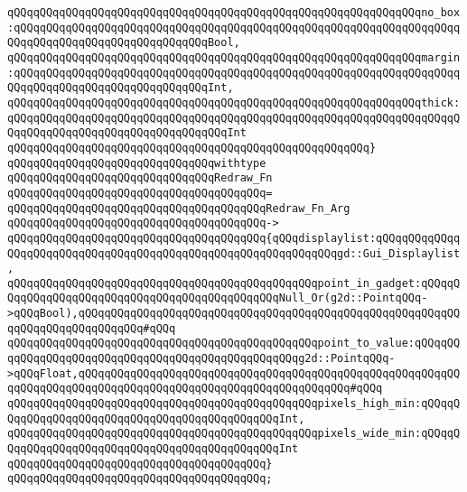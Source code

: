 \newline
\verb|qQQqqQQqqQQqqQQqqQQqqQQqqQQqqQQqqQQqqQQqqQQqqQQqqQQqqQQqqQQqqQQqno_box:qQQqqQQqqQQqqQQqqQQqqQQqqQQqqQQqqQQqqQQqqQQqqQQqqQQqqQQqqQQqqQQqqQQqqQQqqQQqqQQqqQQqqQQqqQQqqQQqqQQqBool,|\newline
\verb|qQQqqQQqqQQqqQQqqQQqqQQqqQQqqQQqqQQqqQQqqQQqqQQqqQQqqQQqqQQqqQQqmargin:qQQqqQQqqQQqqQQqqQQqqQQqqQQqqQQqqQQqqQQqqQQqqQQqqQQqqQQqqQQqqQQqqQQqqQQqqQQqqQQqqQQqqQQqqQQqqQQqqQQqInt,|\newline
\verb|qQQqqQQqqQQqqQQqqQQqqQQqqQQqqQQqqQQqqQQqqQQqqQQqqQQqqQQqqQQqqQQqthick:qQQqqQQqqQQqqQQqqQQqqQQqqQQqqQQqqQQqqQQqqQQqqQQqqQQqqQQqqQQqqQQqqQQqqQQqqQQqqQQqqQQqqQQqqQQqqQQqqQQqqQQqInt|\newline
\verb|qQQqqQQqqQQqqQQqqQQqqQQqqQQqqQQqqQQqqQQqqQQqqQQqqQQqqQQq}|\newline
\verb|qQQqqQQqqQQqqQQqqQQqqQQqqQQqqQQqwithtype|\newline
\verb|qQQqqQQqqQQqqQQqqQQqqQQqqQQqqQQqRedraw_Fn|\newline
\verb|qQQqqQQqqQQqqQQqqQQqqQQqqQQqqQQqqQQqqQQq=|\newline
\verb|qQQqqQQqqQQqqQQqqQQqqQQqqQQqqQQqqQQqqQQqRedraw_Fn_Arg|\newline
\verb|qQQqqQQqqQQqqQQqqQQqqQQqqQQqqQQqqQQqqQQq->|\newline
\verb|qQQqqQQqqQQqqQQqqQQqqQQqqQQqqQQqqQQqqQQq{qQQqdisplaylist:qQQqqQQqqQQqqQQqqQQqqQQqqQQqqQQqqQQqqQQqqQQqqQQqqQQqqQQqqQQqqQQqgd::Gui_Displaylist,|\newline
\verb|qQQqqQQqqQQqqQQqqQQqqQQqqQQqqQQqqQQqqQQqqQQqqQQqpoint_in_gadget:qQQqqQQqqQQqqQQqqQQqqQQqqQQqqQQqqQQqqQQqqQQqqQQqNull_Or(g2d::PointqQQq->qQQqBool),qQQqqQQqqQQqqQQqqQQqqQQqqQQqqQQqqQQqqQQqqQQqqQQqqQQqqQQqqQQqqQQqqQQqqQQqqQQqqQQq#qQQq|\newline
\verb|qQQqqQQqqQQqqQQqqQQqqQQqqQQqqQQqqQQqqQQqqQQqqQQqpoint_to_value:qQQqqQQqqQQqqQQqqQQqqQQqqQQqqQQqqQQqqQQqqQQqqQQqqQQqg2d::PointqQQq->qQQqFloat,qQQqqQQqqQQqqQQqqQQqqQQqqQQqqQQqqQQqqQQqqQQqqQQqqQQqqQQqqQQqqQQqqQQqqQQqqQQqqQQqqQQqqQQqqQQqqQQqqQQqqQQqqQQqqQQq#qQQq|\newline
\verb|qQQqqQQqqQQqqQQqqQQqqQQqqQQqqQQqqQQqqQQqqQQqqQQqpixels_high_min:qQQqqQQqqQQqqQQqqQQqqQQqqQQqqQQqqQQqqQQqqQQqqQQqInt,|\newline
\verb|qQQqqQQqqQQqqQQqqQQqqQQqqQQqqQQqqQQqqQQqqQQqqQQqpixels_wide_min:qQQqqQQqqQQqqQQqqQQqqQQqqQQqqQQqqQQqqQQqqQQqqQQqInt|\newline
\verb|qQQqqQQqqQQqqQQqqQQqqQQqqQQqqQQqqQQqqQQq}|\newline
\verb|qQQqqQQqqQQqqQQqqQQqqQQqqQQqqQQqqQQqqQQq;|\newline

